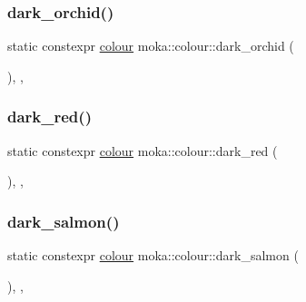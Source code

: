 \subsubsection{\texorpdfstring{dark\_orchid()}{dark\_orchid()}}
{\footnotesize\ttfamily static constexpr \mbox{\hyperlink{classmoka_1_1colour}{colour}} moka\+::colour\+::dark\+\_\+orchid (\begin{DoxyParamCaption}{ }\end{DoxyParamCaption})\hspace{0.3cm}{\ttfamily [inline]}, {\ttfamily [static]}, {\ttfamily [noexcept]}}

\mbox{\label{classmoka_1_1colour_a2c0fe66d73cef636ae8667b81d1d707c}} 
\subsubsection{\texorpdfstring{dark\_red()}{dark\_red()}}
{\footnotesize\ttfamily static constexpr \mbox{\hyperlink{classmoka_1_1colour}{colour}} moka\+::colour\+::dark\+\_\+red (\begin{DoxyParamCaption}{ }\end{DoxyParamCaption})\hspace{0.3cm}{\ttfamily [inline]}, {\ttfamily [static]}, {\ttfamily [noexcept]}}

\mbox{\label{classmoka_1_1colour_a024727ccdbca1f7fff9e8504356bcb3e}} 
\subsubsection{\texorpdfstring{dark\_salmon()}{dark\_salmon()}}
{\footnotesize\ttfamily static constexpr \mbox{\hyperlink{classmoka_1_1colour}{colour}} moka\+::colour\+::dark\+\_\+salmon (\begin{DoxyParamCaption}{ }\end{DoxyParamCaption})\hspace{0.3cm}{\ttfamily [inline]}, {\ttfamily [static]}, {\ttfamily [noexcept]}}

\mbox{\label{classmoka_1_1colour_a877558c45f1d9d85231df2dddfd896a0}} 
